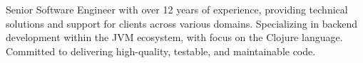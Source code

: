 

\begin{cvparagraph}

Senior Software Engineer with over 12 years of experience, providing technical solutions and support for clients across various domains. Specializing in backend development within the JVM ecosystem, with focus on the Clojure language. Committed to delivering high-quality, testable, and maintainable code.
\end{cvparagraph}
